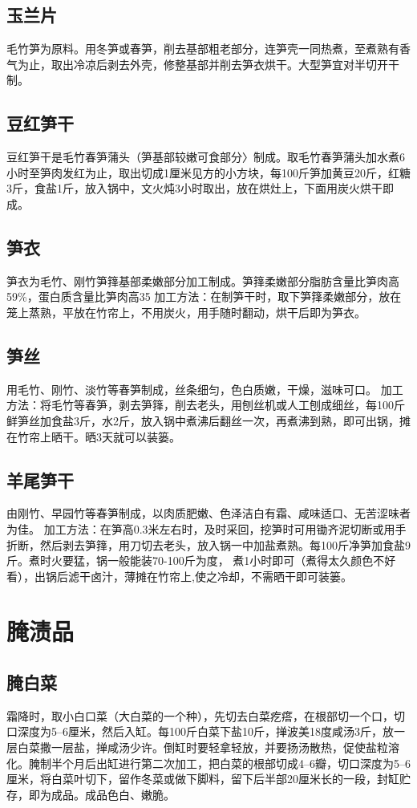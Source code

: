 \documentclass{ctexbook}
\begin{document}
\subsection{玉兰片}
毛竹笋为原料。用冬笋或春笋，削去基部粗老部分，连笋壳一同热煮，至煮熟有香气为止，取出冷凉后剥去外壳，修整基部并削去笋衣烘干。大型笋宜对半切开干制。
\subsection{豆红笋干}
豆红笋干是毛竹春笋蒲头（笋基部较嫩可食部分〉制成。取毛竹春笋蒲头加水煮6小时至笋肉发红为止，取出切成1厘米见方的小方块，每100斤笋加黄豆20斤，红糖3斤，食盐1斤，放入锅中，文火炖3小时取出，放在烘灶上，下面用炭火烘干即成。
\subsection{笋衣}
笋衣为毛竹、刚竹笋箨基部柔嫩部分加工制成。笋箨柔嫩部分脂肪含量比笋肉高59\%，蛋白质含量比笋肉高35%
加工方法：在制笋干时，取下笋箨柔嫩部分，放在笼上蒸熟，平放在竹帘上，不用炭火，用手随时翻动，烘干后即为笋衣。
\subsection{笋丝}
用毛竹、刚竹、淡竹等春笋制成，丝条细匀，色白质嫩，干燥，滋味可口。
加工方法：将毛竹等春笋，剥去笋箨，削去老头，用刨丝机或人工刨成细丝，每100斤鲜笋丝加食盐3斤，水2斤，放入锅中煮沸后翻丝一次，再煮沸到熟，即可出锅，摊在竹帘上晒干。晒3天就可以装篓。
\subsection{羊尾笋干}
由刚竹、早园竹等春笋制成，以肉质肥嫩、色泽洁白有霜、咸味适口、无苦涩味者为佳。
加工方法：在笋高0.3米左右时，及时采回，挖笋时可用锄齐泥切断或用手折断，然后剥去笋箨，用刀切去老头，放入锅一中加盐煮熟。每100斤净笋加食盐9斤。煮时火要猛，锅一般能装70-100斤为度，
煮1小时即可（煮得太久颜色不好看），出锅后滤干卤汁，薄摊在竹帘上,使之冷却，不需晒干即可装篓。
\section{腌渍品}
\subsection{腌白菜}	
霜降时，取小白口菜（大白菜的一个种），先切去白菜疙瘩，在根部切一个口，切口深度为5--6厘米，然后入缸。每100斤白菜下盐10斤，掸波美18度咸汤3斤，放一层白菜撒一层盐，掸咸汤少许。倒缸时要轻拿轻放，并要扬汤散热，促使盐粒溶化。腌制半个月后出缸进行第二次加工，把白菜的根部切成4--6瓣，切口深度为5--6厘米，将白菜叶切下，留作冬菜或做下脚料，留下后半部20厘米长的一段，封缸贮存，即为成品。成品色白、嫩脆。
\end{document}
